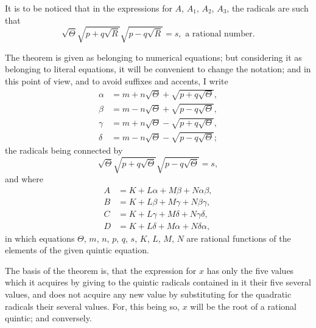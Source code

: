 \documentclass[11pt,a4paper]{article}
\theoremstyle{plain}
\begin{document}
It is to be noticed that in the expressions for $A$, $A_1$, $A_2$, $A_3$, the radicals are such that
\[
\sqrt{\Theta}\sqrt{p+q\sqrt{R}}\sqrt{p-q\sqrt{R}} = s, \text{ a rational number}.
\]

The theorem is given as belonging to numerical equations; but considering it as belonging to literal equations, it will be convenient to change the notation; and in this point of view, and to avoid suffixes and accents, I write
\begin{align*}
\alpha &= m + n\sqrt{\Theta} + \sqrt{p+q\sqrt{\Theta}}, \\
\beta &= m - n\sqrt{\Theta} + \sqrt{p-q\sqrt{\Theta}}, \\
\gamma &= m + n\sqrt{\Theta} - \sqrt{p+q\sqrt{\Theta}}, \\
\delta &= m - n\sqrt{\Theta} - \sqrt{p-q\sqrt{\Theta}};
\end{align*}
the radicals being connected by
\[
\sqrt{\Theta}\sqrt{p+q\sqrt{\Theta}}\sqrt{p-q\sqrt{\Theta}} = s,
\]
and where
\begin{align*}
A &= K + L\alpha + M\beta + N\alpha\beta, \\
B &= K + L\beta + M\gamma + N\beta\gamma, \\
C &= K + L\gamma + M\delta + N\gamma\delta, \\
D &= K + L\delta + M\alpha + N\delta\alpha,
\end{align*}
in which equations $\Theta$, $m$, $n$, $p$, $q$, $s$, $K$, $L$, $M$, $N$ are rational functions of the elements of the given quintic equation.

The basis of the theorem is, that the expression for $x$ has only the five values which it acquires by giving to the quintic radicals contained in it their five several values, and does not acquire any new value by substituting for the quadratic radicals their several values. For, this being so, $x$ will be the root of a rational quintic; and conversely.
\end{document}
